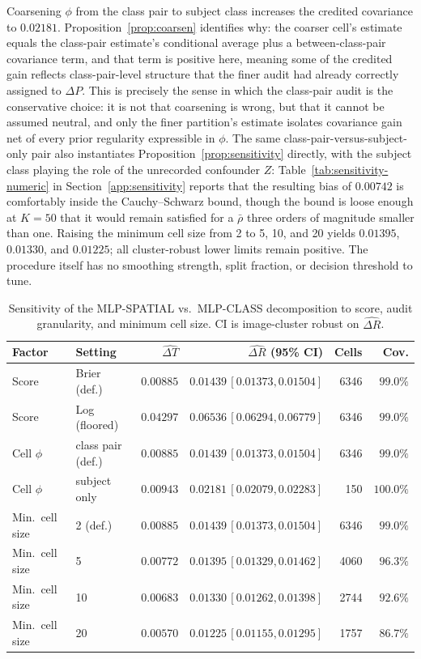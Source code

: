 \documentclass[preprint,times,10pt,a4paper]{elsarticle}
\theoremstyle{plain}
\theoremstyle{definition}
\begin{document}
Coarsening $\phi$ from the class pair to subject class increases the credited covariance
to $0.02181$. Proposition~\ref{prop:coarsen} identifies why: the coarser cell's estimate
equals the class-pair estimate's conditional average plus a between-class-pair covariance
term, and that term is positive here, meaning some of the credited gain reflects
class-pair-level structure that the finer audit had already correctly assigned to
$\Delta P$. This is precisely the sense in which the class-pair audit is the conservative
choice: it is not that coarsening is wrong, but that it cannot be assumed neutral, and
only the finer partition's estimate isolates covariance gain net of every prior regularity
expressible in $\phi$. The same class-pair-versus-subject-only pair also instantiates
Proposition~\ref{prop:sensitivity} directly, with the subject class playing the role of
the unrecorded confounder $Z$: Table~\ref{tab:sensitivity-numeric} in
Section~\ref{app:sensitivity} reports that the resulting bias of $0.00742$ is comfortably
inside the Cauchy--Schwarz bound, though the bound is loose enough at $K=50$ that it
would remain satisfied for a $\bar\rho$ three orders of magnitude smaller than one.
Raising the minimum cell size from 2 to 5, 10, and 20 yields
$0.01395$, $0.01330$, and $0.01225$; all cluster-robust lower limits remain positive.
The procedure itself has no smoothing strength, split fraction, or decision threshold
to tune.

\begin{table}[t]
\centering
\caption{Sensitivity of the MLP-SPATIAL vs.\ MLP-CLASS decomposition to score, audit
granularity, and minimum cell size. CI is image-cluster robust on $\widehat{\Delta R}$.}
\label{tab:sensitivity}
\small
\begin{tabular}{@{}llrr@{\,}rr@{}}
\toprule
Factor & Setting & $\widehat{\Delta T}$ & \multicolumn{1}{r}{$\widehat{\Delta R}$ (95\% CI)} & Cells &
Cov. \\
\midrule
Score & Brier (def.) & $0.00885$ & $0.01439\,[0.01373,0.01504]$ & 6346 & $99.0\%$ \\
Score & Log (floored) & $0.04297$ & $0.06536\,[0.06294,0.06779]$ & 6346 & $99.0\%$ \\
Cell $\phi$ & class pair (def.) & $0.00885$ & $0.01439\,[0.01373,0.01504]$ & 6346 & $99.0\%$ \\
Cell $\phi$ & subject only & $0.00943$ & $0.02181\,[0.02079,0.02283]$ & 150 & $100.0\%$ \\
Min.\ cell size & 2 (def.) & $0.00885$ & $0.01439\,[0.01373,0.01504]$ & 6346 & $99.0\%$ \\
Min.\ cell size & 5 & $0.00772$ & $0.01395\,[0.01329,0.01462]$ & 4060 & $96.3\%$ \\
Min.\ cell size & 10 & $0.00683$ & $0.01330\,[0.01262,0.01398]$ & 2744 & $92.6\%$ \\
Min.\ cell size & 20 & $0.00570$ & $0.01225\,[0.01155,0.01295]$ & 1757 & $86.7\%$ \\
\bottomrule
\end{tabular}
\end{table}
\end{document}
